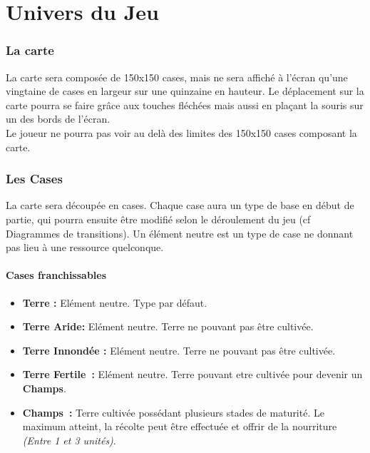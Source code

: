 \documentclass[a4paper]{article}
\begin{document}

  \newpage
  \part{Univers du Jeu}
    \section{La carte}

      La carte sera composée de 150x150 cases, mais ne sera affiché à l'écran qu'une vingtaine de cases en largeur sur une quinzaine en hauteur. Le déplacement sur la carte pourra se faire grâce aux touches fléchées mais aussi en plaçant la souris sur un des bords de l'écran.\\
      Le joueur ne pourra pas voir au delà des limites des 150x150 cases composant la carte.

    \section{Les Cases}

      La carte sera découpée en cases. Chaque case aura un type de base en début de partie, qui pourra ensuite être modifié selon le déroulement du jeu (cf Diagrammes de transitions). Un élément neutre est un type de case ne donnant pas lieu à une ressource quelconque.

	  
      \subsection{Cases franchissables}
        \begin{itemize}
          \item \textbf{Terre :} \small{ Elément neutre. Type par défaut.}
          \item \textbf{Terre Aride:} \small{ Elément neutre. Terre ne pouvant pas être cultivée.}
          \item \textbf{Terre Innondée :} \small{ Elément neutre. Terre ne pouvant pas être cultivée.}
          \item \textbf{Terre Fertile :} \small{ Elément neutre. Terre pouvant etre cultivée pour devenir un \textbf{Champs}.}
          \item \textbf{Champs :} \small{ Terre cultivée possédant plusieurs stades de maturité. Le maximum atteint, la récolte peut être effectuée et offrir de la nourriture \textit{(Entre 1 et 3 unités)}.}
        \end{itemize}
\end{document}

